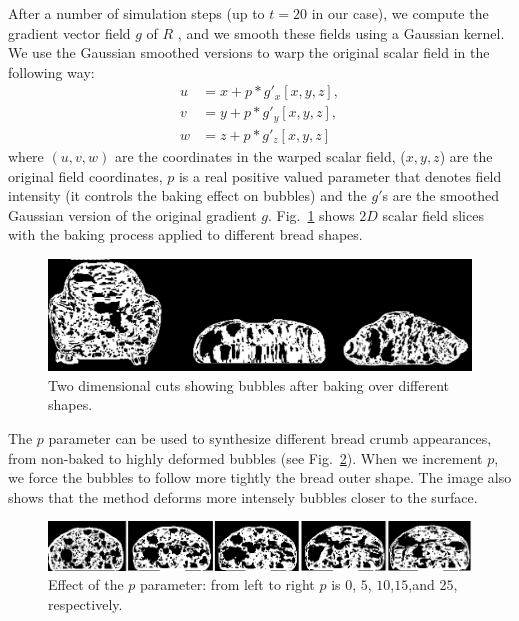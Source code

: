 After a number of simulation steps (up to $t=20$ in our case), we compute the gradient vector field $g$ of $R$ \cite{Gonzalez2006}, and we smooth these fields using a Gaussian kernel.
We use the Gaussian smoothed versions to warp the original scalar field in the following way:
\begin{align*}
\displaystyle
u &= x+p*g'_{x}[x,y,z],\\
v &= y+p*g'_{y}[x,y,z],\\
w &= z+p*g'_{z}[x,y,z]
\end{align*}
where $(u,v,w)$ are the coordinates in the warped scalar field, ($x,y,z$) are the original field coordinates, $p$ is a real positive valued parameter that denotes field intensity (it controls the baking effect on bubbles) and the $g'$s are the smoothed Gaussian version of the original gradient $g$.
Fig.~\ref{fg:bakedbubbles} shows $2D$ scalar field slices with the baking process applied to different bread shapes.

\begin{figure}
\includegraphics[width=13cm]{figures/bakedbubbles}
\caption{Two dimensional cuts showing bubbles after baking over different shapes.}
\label{fg:bakedbubbles}
\end{figure}

The $p$ parameter can be used to synthesize different bread crumb appearances, from non-baked to highly deformed bubbles (see Fig.~\ref{fg:parameterp}).
When we increment $p$, we force the bubbles to follow more tightly the bread outer shape. 
The image also shows that the method deforms more intensely bubbles closer to the surface.

\begin{figure}
\includegraphics[width=13cm]{figures/parameterp}
\caption{Effect of the $p$ parameter: from left to right $p$ is $0$, $5$, $10$,$15$,and $25$, respectively.}
\label{fg:parameterp}
\end{figure}


